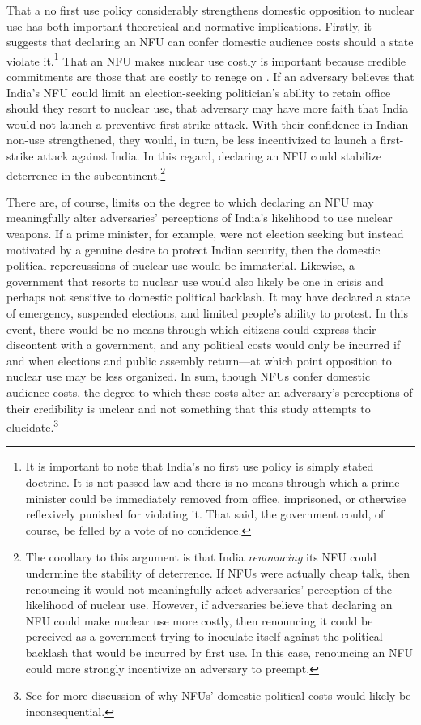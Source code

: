 \documentclass[12pt]{article}
\begin{document}
That a no first use policy considerably strengthens domestic opposition to nuclear use has both important theoretical and normative implications. Firstly, it suggests that declaring an NFU can confer domestic audience costs should a state violate it.\footnote{It is important to note that India's no first use policy is simply stated doctrine. It is not passed law and there is no means through which a prime minister could be immediately removed from office, imprisoned, or otherwise reflexively punished for violating it. That said, the government could, of course, be felled by a vote of no confidence.} That an NFU makes nuclear use costly is important because credible commitments are those that are costly to renege on \citep{fearon_domestic_1994}. If an adversary believes that India's NFU could limit an election-seeking politician's ability to retain office should they resort to nuclear use, that adversary may have more faith that India would not launch a preventive first strike attack. With their confidence in Indian non-use strengthened, they would, in turn, be less incentivized to launch a first-strike attack against India. In this regard, declaring an NFU could stabilize deterrence in the subcontinent.\footnote{The corollary to this argument is that India \textit{renouncing} its NFU could undermine the stability of deterrence. If NFUs were actually cheap talk, then renouncing it would not meaningfully affect adversaries' perception of the likelihood of nuclear use. However, if adversaries believe that declaring an NFU could make nuclear use more costly, then renouncing it could be perceived as a government trying to inoculate itself against the political backlash that would be incurred by first use. In this case, renouncing an NFU could more strongly incentivize an adversary to preempt.}

There are, of course, limits on the degree to which declaring an NFU may meaningfully alter adversaries' perceptions of India's likelihood to use nuclear weapons. If a prime minister, for example, were not election seeking but instead motivated by a genuine desire to protect Indian security, then the domestic political repercussions of nuclear use would be immaterial. Likewise, a government that resorts to nuclear use would also likely be one in crisis and perhaps not sensitive to domestic political backlash. It may have declared a state of emergency, suspended elections, and limited people's ability to protest. In this event, there would be no means through which citizens could express their discontent with a government, and any political costs would only be incurred if and when elections and public assembly return—at which point opposition to nuclear use may be less organized. In sum, though NFUs confer domestic audience costs, the degree to which these costs alter an adversary's perceptions of their credibility is unclear and not something that this study attempts to elucidate.\footnote{See \citet{talmadge_when_2024} for more discussion of why NFUs' domestic political costs would likely be inconsequential.}
\end{document}
